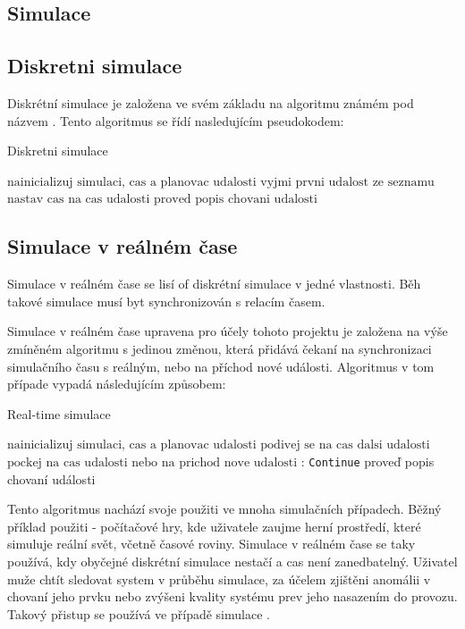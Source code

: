 \subsection{Simulace}
\subsection{Diskretni simulace}
Diskrétní simulace je založena ve svém základu na algoritmu známém pod názvem . Tento algoritmus se řídí nasledujícím pseudokodem:
\begin{algorithm}
  \caption{Diskretni simulace}\label{euclid}
  \begin{algorithmic}[1]
  \State $\text{nainicializuj simulaci, cas a planovac udalosti}$
  \State $\text{vyjmi prvni udalost ze seznamu}$
    \Return
  \EndIf
  \State $\text{nastav cas na cas udalosti}$
  \State $\text{proved popis chovani udalosti}$
  \EndWhile
  \end{algorithmic}
  \end{algorithm}
\subsection{Simulace v reálném čase}
Simulace v reálném čase se lisí of diskrétní simulace v jedné vlastnosti. Běh takové simulace musí byt synchronizován s relacím časem. 

Simulace v reálném čase upravena pro účely tohoto projektu je založena na výše zmíněném algoritmu  s jedinou změnou, která přidává čekaní na synchronizaci simulačního času s reálným, nebo na příchod nové události. Algoritmus v tom případe vypadá následujícím způsobem:

\begin{algorithm}
\caption{Real-time simulace}\label{euclid}
\begin{algorithmic}[1]
\State $\text{nainicializuj simulaci, cas a planovac udalosti}$
\State $\text{podivej se na cas dalsi udalosti}$
\Return
\EndIf
\State $\text{pockej na cas udalosti nebo na prichod nove udalosti}$
:
    \State \texttt{Continue}
\EndIf
\State proveď popis chovaní události
\EndWhile
\end{algorithmic}
\end{algorithm}

Tento algoritmus nachází svoje použiti ve mnoha simulačních případech. Běžný příklad použiti - počítačové hry, kde uživatele zaujme herní prostředí, které simuluje reální svět, včetně časové roviny. Simulace v reálném čase se taky používá, kdy obyčejné diskrétní simulace nestačí a cas není zanedbatelný. Uživatel muže chtít sledovat system v průběhu simulace, za účelem zjištěni anomálii v chovaní jeho prvku nebo zvýšeni kvality systému prev jeho nasazením do provozu. Takový přistup se používá ve případě simulace \hyperref[subsec:hwil]{}.

